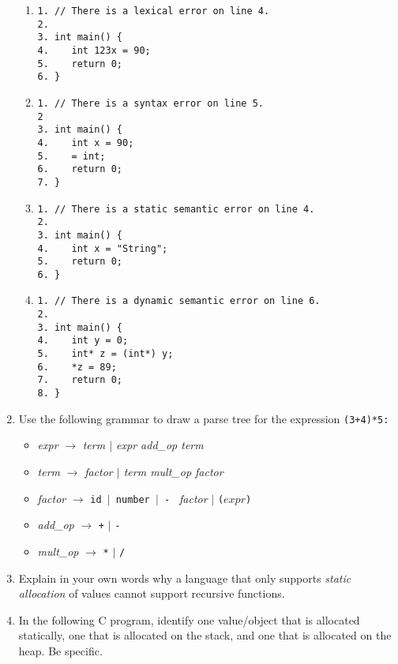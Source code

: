 \documentclass[9pt]{article}
\begin{document}
\begin{enumerate}
      \begin{enumerate}
         \item \begin{verbatim}
1. // There is a lexical error on line 4.
2.
3. int main() {
4.    int 123x = 90;
5.    return 0;
6. }
         \end{verbatim}
         \item \begin{verbatim}
1. // There is a syntax error on line 5.
2
3. int main() {
4.    int x = 90;
5.    = int;
6.    return 0;
7. }
         \end{verbatim}
         \item \begin{verbatim}
1. // There is a static semantic error on line 4.
2.
3. int main() {
4.    int x = "String";
5.    return 0;
6. }
         \end{verbatim}
         \item \begin{verbatim}
1. // There is a dynamic semantic error on line 6.
2.
3. int main() {
4.    int y = 0;
5.    int* z = (int*) y;
6.    *z = 89;
7.    return 0;
8. }
         \end{verbatim}
      \end{enumerate}
   \item Use the following grammar to draw a parse tree for the expression
         \verb|(3+4)*5:|

         \begin{itemize}
            \item \textit{expr} $\rightarrow$ \textit{term $|$ expr add\_op term}
            \item \textit{term} $\rightarrow$ \textit{factor $|$ term mult\_op 
                  factor}
            \item \textit{factor} $\rightarrow$ \texttt{id $|$  number $|$ - }
                  \textit{factor} $|$ \verb|(|$expr$\verb|)|
            \item \textit{add\_op} $\rightarrow$ \verb|+| $|$ \verb|-|
            \item \textit{mult\_op} $\rightarrow$ \verb|*| $|$ \verb|/|
         \end{itemize}
   \item Explain in your own words why a language that only supports
         \textit{static allocation} of values cannot support recursive
         functions.
   \item In the following C program, identify one value/object that is allocated
         statically, one that is allocated on the stack, and one that is
         allocated on the heap. Be specific.


\end{enumerate}
\end{document}
